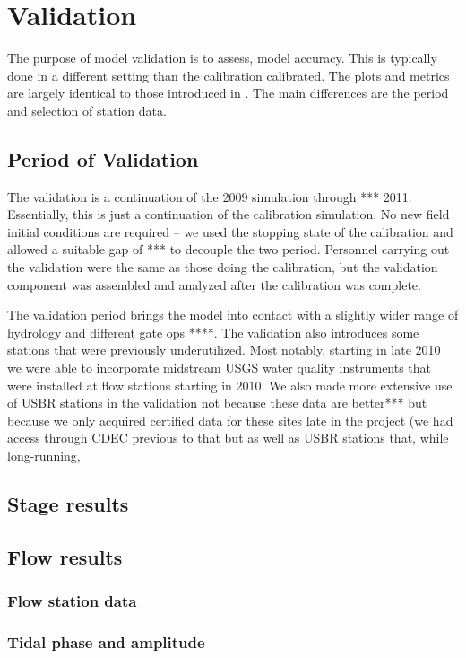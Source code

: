 \chapter{Validation}
The purpose of model validation is to assess, model accuracy. This is typically
done in a different setting than the calibration calibrated. The plots and metrics are largely identical to those introduced in 
\label{chap:validate}. The main differences are the period and selection of station data.

\section{Period of Validation}
The validation is a continuation of the 2009 simulation through *** 2011. Essentially, this is just a
continuation of the calibration simulation. No new field initial conditions are required -- we used the
stopping state of the calibration and allowed a suitable gap of *** to decouple the two period. 
Personnel carrying out the validation were the same as those doing the calibration, but the  
validation component was assembled and analyzed after the calibration was complete.

The validation period brings the model into contact with a slightly wider range of hydrology and
different gate ops ****. The validation also introduces some stations that were previously underutilized. 
Most notably, starting in late 2010 we were able to incorporate midstream USGS water quality 
instruments that were installed at flow stations starting in 2010. We also made more extensive use of USBR 
stations in the validation not because these data are better*** but because
we only acquired certified data for these sites late in the project (we had access through CDEC previous to that
but  as well as USBR stations that, while long-running, 


\section{Stage results}
\section{Flow results}
	\subsection{Flow station data}
	\subsection{Tidal phase and amplitude}
